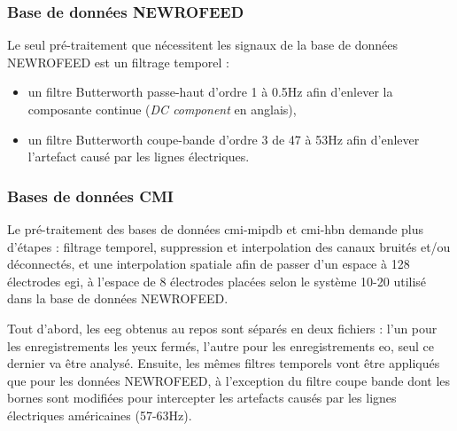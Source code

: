\subsubsection{Base de données NEWROFEED}
Le seul pré-traitement que nécessitent les signaux de la base de données NEWROFEED est un filtrage temporel : 
\begin{itemize}
\item un filtre Butterworth passe-haut d'ordre 1 à 0.5Hz afin d'enlever la composante continue (\textit{DC component} en anglais),
\item un filtre Butterworth coupe-bande d'ordre 3 de 47 à 53Hz afin d'enlever l'artefact causé par les lignes électriques.
\end{itemize}

\subsubsection{Bases de données CMI} \label{treatment_cmi_databases}

Le pré-traitement des bases de données \gls{cmi-mipdb} et \gls{cmi-hbn} demande plus d'étapes : filtrage temporel, suppression et 
interpolation des canaux bruités et/ou déconnectés, et une interpolation spatiale afin de passer d'un espace à 128 électrodes \gls{egi},
à l'espace de 8 électrodes placées selon le système 10-20 utilisé dans la base de données NEWROFEED.

Tout d'abord, les \gls{eeg} obtenus au repos sont séparés en deux fichiers : l'un pour les enregistrements les yeux fermés, 
l'autre pour les enregistrements \gls{eo}, seul ce dernier va être analysé. Ensuite, les mêmes filtres temporels vont être appliqués
que pour les données NEWROFEED, à l'exception du filtre coupe bande dont les bornes sont modifiées pour intercepter les artefacts 
causés par les lignes électriques américaines (57-63Hz).


